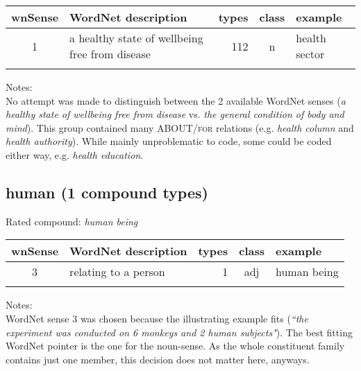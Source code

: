 
\noindent
\begin{longtable}{c>{\raggedright\arraybackslash}p{5cm}rc>{\raggedright\arraybackslash}p{2cm}}\lsptoprule
{\small wnSense}&WordNet description&types&class&example\\\midrule
1&a healthy state of wellbeing free from disease&112&n&health sector\\\lspbottomrule
\end{longtable}

\noindent
Notes:\\
No attempt was made to distinguish between the 2 available WordNet
senses (\emph{a healthy state of wellbeing free from disease}
vs. \emph{the general condition of body and mind}). This group
contained many ABOUT/\textsc{for} relations (e.g. \emph{health column}
and \emph{health authority}). While mainly unproblematic to code, some
could be coded either way, e.g. \emph{health education}.


\subsection{human   (1 compound types)}
Rated compound: \emph{human being}


\noindent
\begin{longtable}{c>{\raggedright\arraybackslash}p{5cm}rc>{\raggedright\arraybackslash}p{2cm}}\lsptoprule
{\small wnSense}&WordNet description&types&class&example\\\midrule
3&relating to a person&1&adj&human being\\\lspbottomrule
\end{longtable}

\noindent
Notes:\\
WordNet sense 3 was chosen because the illustrating example fits
(\emph{``the experiment was conducted on 6 monkeys and 2 human
  subjects"}). The best fitting WordNet pointer is the one for the
noun-sense. As the whole constituent family contains just one member,
this decision does not matter here, anyways.

\pagebreak[4]
